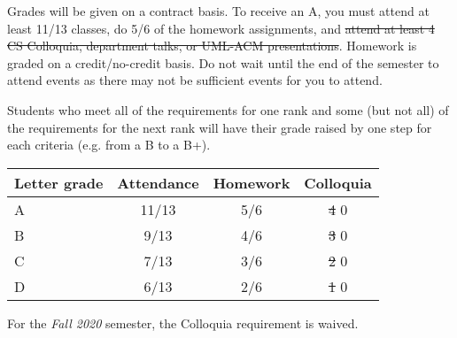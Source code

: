 Grades will be given on a contract basis.
To receive an A, you must attend at least 11/13 classes, do 5/6 of the homework assignments, and \st{attend at least 4 CS Colloquia, department talks, or UML-ACM presentations}.  
Homework is graded on a credit/no-credit basis.
Do not wait until the end of the semester to attend events as there may not be sufficient events for you to attend.

Students who meet all of the requirements for one rank and some (but not all) of the requirements for the next rank will have their grade raised by one step for each criteria (e.g. from a B to a B+).

\begin{center}\begin{tabular}{|l|c|c|c|}\hline
    Letter grade & Attendance & Homework & Colloquia\\
    \hline
    A & 11/13 & 5/6 & \st{4} 0  \\
    B & 9/13 & 4/6 & \st{3} 0 \\
    C & 7/13 & 3/6 & \st{2} 0  \\
    D & 6/13 & 2/6 & \st{1} 0 \\
    \hline
\end{tabular}\end{center}

For the \emph{Fall 2020} semester, the Colloquia requirement is waived.